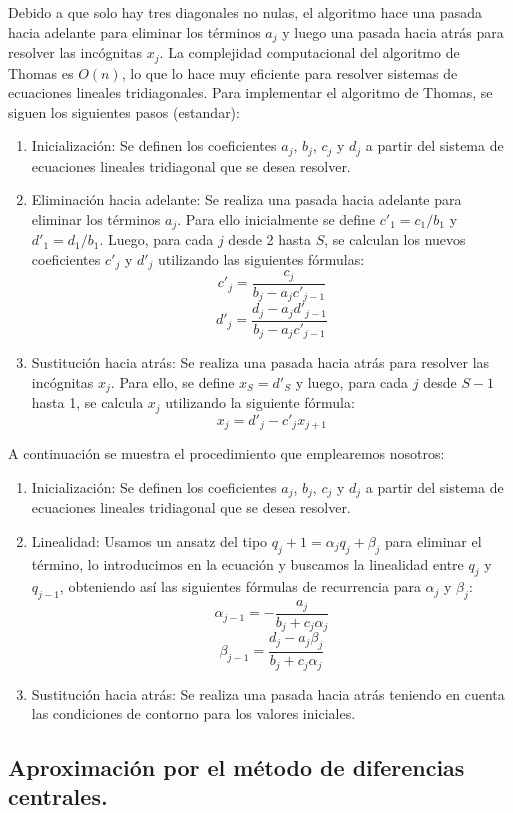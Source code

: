 \documentclass[10pt,onecolumn]{article}
\begin{document}
Debido a que solo hay tres diagonales no nulas, el algoritmo hace una pasada hacia adelante para eliminar los términos $a_j$ y luego una pasada hacia atrás para resolver las incógnitas $x_j$. La complejidad computacional del algoritmo de Thomas es $O(n)$, lo que lo hace muy eficiente para resolver sistemas de ecuaciones lineales tridiagonales. Para implementar el algoritmo de Thomas, se siguen los siguientes pasos (estandar):
\begin{enumerate}
    \item Inicialización: Se definen los coeficientes $a_j$, $b_j$, $c_j$ y $d_j$ a partir del sistema de ecuaciones lineales tridiagonal que se desea resolver.
    \item Eliminación hacia adelante: Se realiza una pasada hacia adelante para eliminar los términos $a_j$. Para ello inicialmente se define $c'_1 = c_1 / b_1$ y $d'_1 = d_1 / b_1$. Luego, para cada $j$ desde 2 hasta $S$, se calculan los nuevos coeficientes $c'_j$ y $d'_j$ utilizando las siguientes fórmulas:
    \begin{equation}
        c'_j = \dfrac{c_j}{b_j - a_j c'_{j-1}}
    \end{equation}
    \begin{equation}        d'_j = \dfrac{d_j - a_j d'_{j-1}}{b_j - a_j c'_{j-1}}
    \end{equation}
    \item Sustitución hacia atrás: Se realiza una pasada hacia atrás para resolver las incógnitas $x_j$. Para ello, se define $x_S = d'_S$ y luego, para cada $j$ desde $S-1$ hasta 1, se calcula $x_j$ utilizando la siguiente fórmula:
    \begin{equation}        x_j = d'_j - c'_j x_{j+1}
    \end{equation}
\end{enumerate}



A continuación se muestra el procedimiento que emplearemos nosotros:

\begin{enumerate}
    \item Inicialización: Se definen los coeficientes $a_j$, $b_j$, $c_j$ y $d_j$ a partir del sistema de ecuaciones lineales tridiagonal que se desea resolver.
    \item Linealidad: Usamos un ansatz del tipo $q_j+1 = \alpha_j q_j + \beta_j$ para eliminar el término, lo introducimos en la ecuación y buscamos la linealidad entre $q_j$ y $q_{j-1}$, obteniendo así las siguientes fórmulas de recurrencia para $\alpha_j$ y $\beta_j$:
    \begin{equation}
        \alpha_{j-1} = -\dfrac{a_j}{b_j + c_j \alpha_j}
    \end{equation}
    \begin{equation}        
        \beta_{j-1} = \dfrac{d_j - a_j \beta_{j}}{b_j + c_j \alpha_j}
    \end{equation}
    \item Sustitución hacia atrás: Se realiza una pasada hacia atrás teniendo en cuenta las condiciones de contorno para los valores iniciales.
\end{enumerate}

\subsection{Aproximación por el método de diferencias centrales.}



\end{document}
